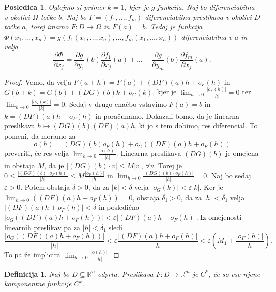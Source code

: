\documentclass[10pt, a4paper]{article}
\newtheorem{posledica}[izr]{Posledica}
\newtheorem{defi}{Definicija}[section]
\newenvironment{noticeB}{%
  \tcolorbox[%
  notitle,
  empty,
  enhanced,  %
  breakable,
  coltext=black,
  colback=white, 
  fontupper=\rmfamily,
  parbox=false,
  noparskip,
  sharp corners,
  boxrule=-1pt,  %
  frame hidden,
  left=7pt,  %
  right=7pt,
  top=5pt,
  bottom=5pt,
  before skip=2.5ex plus 2pt,
  after skip=2.5ex plus 2pt,
  borderline west = {1.5pt}{-0.1pt}{blue!30!black}, %
  overlay unbroken and last={%
    \draw[color=black, line width=1.25pt]
    ($(frame.south west)+(1.pt, -0.1pt)$) -- ++(2em, 0);
  }
  ]}
{\endtcolorbox}
\newenvironment{definicija}{\begin{defi}\begin{noticeB}}{%
    \end{noticeB}\end{defi}}
\newenvironment{noticeC}{%
  \tcolorbox[%
  notitle,
  empty,
  enhanced,  %
  breakable,
  coltext=black, 
  fontupper=\rmfamily,
  parbox=false,
  noparskip,
  sharp corners,
  boxrule=-1pt,  %
  frame hidden,
  left=7pt,  %
  right=7pt,
  top=5pt,
  bottom=5pt,
  before skip=2.5ex plus 2pt,
  after skip=2.5ex plus 2pt,
  overlay unbroken and last={%
  },
  ]}
{\endtcolorbox}
\newenvironment{dokaz}%
  {\begin{noticeC}\begin{proof}}%
  {\end{proof}\end{noticeC}}
\newcommand{\R}{\mathbb {R}}
\begin{document}
\begin{posledica} \label{pos:1}
    Oglejmo si primer $k = 1$, kjer je $g$ funkcija.
    Naj bo diferenciabilna v okolici $\Omega$ točke $b$.
    Naj bo $F = (f_1, \dots, f_m)$ diferenciabilna preslikava v okolici $D$ točke $a$,
    torej imamo $F: D \to \Omega$ in $F(a) = b$.
    Tedaj je funkcija $\Phi(x_1, \dots, x_n) = g(f_1(x_1, \dots, x_n), \dots, f_m(x_1, \dots, x_n))$
    diferenciabilna v $a$ in velja 
    $$\frac{\partial \Phi}{\partial x_j} = \frac{\partial g}{\partial y_1} (b) \frac{\partial f_1}{\partial x_j} (a) + \dots + \frac{\partial g}{\partial y_m} (b) \frac{\partial f_m}{\partial x_j} (a).$$
\end{posledica}

\begin{dokaz}
    Vemo, da velja $F(a + h) = F(a) + (DF)(a)h + o_F (h)$ in $G(b + k) = G(b) + (DG) (b) k + o_G (k)$,
    kjer je $\lim_{h \to 0} \frac{|o_F (h)|}{|h|} = 0$ ter $\lim_{k \to 0} \frac{|o_G (k)|}{|k|} = 0$.
    Sedaj v drugo enačbo vstavimo $F(a) = b$ in $k = (DF)(a)h + o_F (h)$ in poračunamo.
    Dokazali bomo, da je linearna preslikava $h \mapsto (DG)(b) (DF) (a) h$, ki jo s tem dobimo, res diferencial.
    To pomeni, da moramo za $$o(h) = (DG) (b) o_F (h) + o_G ((DF) (a) h + o_F (h))$$ preveriti, 
    če res velja $\lim_{h \to 0} \frac{|o(h)|}{|h|}$. Linearna preslikava $(DG) (b)$ je omejena in obstaja $M$,
    da je $|(DG) (b) \cdot v| \leq M|v|$, $\forall v$. Torej je $0 \leq \frac{|(DG) (b) \cdot o_F (h)|}{|h|} \leq M \frac{|o_F(h)|}{|h|}$ 
    in $\lim_{h \to 0} \frac{|(DG) (b) \cdot o_F (h)|}{|h|} = 0$.
    Naj bo sedaj $\varepsilon > 0$. Potem obstaja $\delta > 0$, da za $|k| < \delta$ velja $|o_G (k)| < \varepsilon |k|$.
    Ker je $\lim_{h \to 0} ((DF)(a)h + o_F(h)) = 0$, obstaja $\delta_1 > 0$, da za $|h| < \delta_1$ velja
    $|(DF)(a)h + o_F(h)| < \delta$ in posledično $|o_G ((DF)(a)h + o_F(h))| < \varepsilon |(DF)(a)h + o_F(h)|$.
    Iz omejenosti linearnih preslikav pa za $|h| < \delta_1$ sledi $$\frac{|o_G ((DF)(a)h + o_F(h))|}{|h|} < \varepsilon \frac{|(DF)(a)h + o_F(h)|}{|h|} < \varepsilon \left(M_1 + \frac{|o_F (h)|}{|h|}\right).$$
    To pa že implicira $\lim_{h \to 0} \frac{|o(h)|}{|h|}$.
\end{dokaz}

\begin{definicija}
    Naj bo $D \subseteq \R^n$ odprta. Preslikava $F: D \to \R^m$ je $C^k$, če so vse njene komponentne funkcije $C^k$.
\end{definicija}
\end{document}
